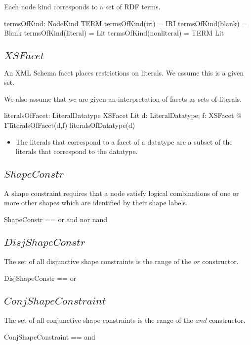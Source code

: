 \documentclass{article}
\begin{document}
Each node kind corresponds to a set of RDF terms.
\begin{axdef}
	termsOfKind: NodeKind \fun \power TERM
\where
	termsOfKind(iri) = IRI
\also
	termsOfKind(blank) = Blank
\also
	termsOfKind(literal) = Lit
\also
	termsOfKind(nonliteral) = TERM \setminus Lit
\end{axdef}

\subsection{$XSFacet$}
An XML Schema facet places restrictions on literals.
We assume this is a given set.
\begin{zed}
	[XSFacet]
\end{zed}

We also assume that we are given an interpretation of facets as sets of literals.
\begin{axdef}
	literalsOfFacet: LiteralDatatype \cross XSFacet \fun \power Lit
\where
	\forall d: LiteralDatatype; f: XSFacet @ \\
\t1		literalsOfFacet(d,f) \subseteq literalsOfDatatype(d)
\end{axdef}
\begin{itemize}
\item The literals that correspond to a facet of a datatype are a subset of the literals that correspond to the datatype.
\end{itemize}

\subsection{$ShapeConstr$}
A shape constraint requires that a node satisfy logical combinations of one or more other shapes which are identified by their shape labels.
\begin{zed}
	ShapeConstr == \ran or \cup \ran and \cup \ran nor \cup \ran nand
\end{zed}

\subsection{$DisjShapeConstr$}
The set of all disjunctive shape constraints is the range of the $or$ constructor.
\begin{zed}
	DisjShapeConstr == \ran or
\end{zed}

\subsection{$ConjShapeConstraint$}
The set of all conjunctive shape constraints is the range of the $and$ constructor.
\begin{zed}
	ConjShapeConstraint == \ran and
\end{zed}
\end{document}
